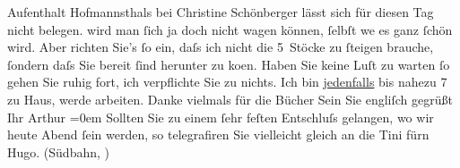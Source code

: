 \begin{ledgroupsized}[t]{13cm}
{{{                  Aufenthalt Hofmannsthals bei Christine Schönberger lässt sich für diesen Tag nicht
                  belegen.}}}\label{K_L00549_1h} wird man ſich ja doch nicht {\pb}wagen
               können, ſelbſt we{\geminationn} es ganz ſchön wird. Aber richten
               Sie’s ſo ein, daſs ich nicht die 5 Stöcke zu ſteigen brauche, ſondern daſs Sie bereit
               ſind herunter zu ko{\geminationm}en. Haben Sie keine Luſt zu warten
               ſo gehen Sie ruhig fort, ich verpflichte Sie zu {\pb}nichts. Ich bin \uline{jedenfalls} bis nahezu 7 zu Haus,
               werde arbeiten.\pend
           \pstart
           Danke vielmals für die Bücher\pend
           \pstart
           Sein Sie engliſch gegrüßt{\\[\baselineskip]}Ihr \spacefill\mbox{Arthur}\pend
           \leftskip=0em{}\pstart
           Sollten Sie zu einem ſehr feſten Entschluſs gelangen, wo {\pb}wir heute Abend ſein werden, so telegrafiren Sie
               vielleicht gleich an die Tini fürn Hugo. (Südbahn,
                  \label{K_L00549_2v}\label{K_L00549_2h})\pend
           \endnumbering{}\end{ledgroupsized}  \newcommand{\dateiname}{L00549}\newcommand{\titel}{Arthur Schnitzler an Richard Beer-Hofmann, [4. 6. 1896?]}\newcommand{\editorInnen}{Martin Anton Müller und Gerd-Hermann Susen}
      